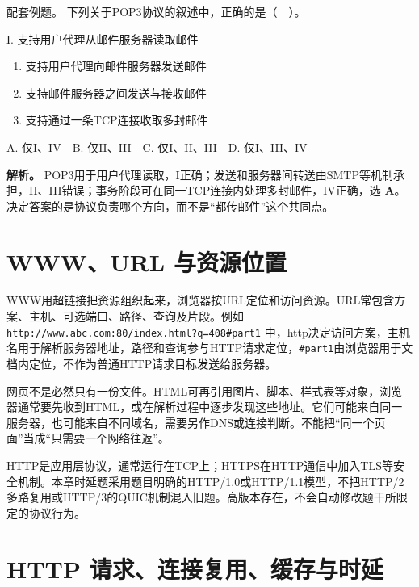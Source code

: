 \begin{example}[配套例题]

配套例题。 下列关于POP3协议的叙述中，正确的是（　）。

I. 支持用户代理从邮件服务器读取邮件

\begin{enumerate}
\def\labelenumi{\Roman{enumi}.}
\setcounter{enumi}{1}
\item
  支持用户代理向邮件服务器发送邮件
\item
  支持邮件服务器之间发送与接收邮件
\item
  支持通过一条TCP连接收取多封邮件
\end{enumerate}

A. 仅I、IV　B. 仅II、III　C. 仅I、II、III　D. 仅I、III、IV

\end{example}

\textbf{解析。} POP3用于用户代理读取，I正确；发送和服务器间转送由SMTP等机制承担，II、III错误；事务阶段可在同一TCP连接内处理多封邮件，IV正确，选 \textbf{A}。决定答案的是协议负责哪个方向，而不是``都传邮件''这个共同点。

\section{WWW、URL 与资源位置}\label{CN06-07}

WWW用超链接把资源组织起来，浏览器按URL定位和访问资源。URL常包含方案、主机、可选端口、路径、查询及片段。例如 \texttt{http:\allowbreak{}/\allowbreak{}/\allowbreak{}www.abc.com:\allowbreak{}80/\allowbreak{}index.html?q=\allowbreak{}408\#part1} 中，http决定访问方案，主机名用于解析服务器地址，路径和查询参与HTTP请求定位，\texttt{\#part1}由浏览器用于文档内定位，不作为普通HTTP请求目标发送给服务器。

网页不是必然只有一份文件。HTML可再引用图片、脚本、样式表等对象，浏览器通常要先收到HTML，或在解析过程中逐步发现这些地址。它们可能来自同一服务器，也可能来自不同域名，需要另作DNS或连接判断。不能把``同一个页面''当成``只需要一个网络往返''。

HTTP是应用层协议，通常运行在TCP上；HTTPS在HTTP通信中加入TLS等安全机制。本章时延题采用题目明确的HTTP/1.0或HTTP/1.1模型，不把HTTP/2多路复用或HTTP/3的QUIC机制混入旧题。高版本存在，不会自动修改题干所限定的协议行为。

\section{HTTP 请求、连接复用、缓存与时延}\label{CN06-08}

